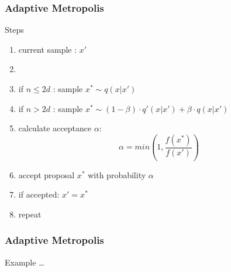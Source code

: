 \begin{frame}
\frametitle{Adaptive Metropolis}

\begin{block}{Steps}
\begin{enumerate}
  \item current sample : $x'$
  \item[]
\item if $n\leq 2d$ : sample $x^* \sim q(x | x')$
\item if $n> 2d$ : sample $x^* \sim (1-\beta) \cdot q'(x | x') +
\beta \cdot q(x | x')$
\item calculate acceptance $\alpha$:
\[\alpha = min\left(1, \frac{f(x^*)}{f(x')} \right)\]

\item accept proposal $x^*$ with probability $\alpha$
\item if accepted: $x' = x^*$
\item repeat
\end{enumerate}
\end{block}
\end{frame}

\begin{frame}
\frametitle{Adaptive Metropolis}
Example \ldots
\end{frame}